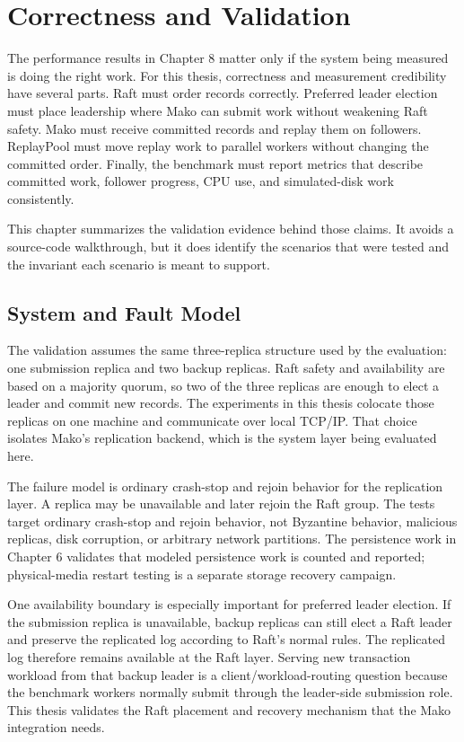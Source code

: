 \chapter{Correctness and Validation}

The performance results in Chapter 8 matter only if the system being measured is
doing the right work. For this thesis, correctness and measurement credibility
have several parts. Raft must order records correctly. Preferred leader election
must place leadership where Mako can submit work without weakening Raft safety.
Mako must receive committed records and replay them on followers. ReplayPool
must move replay work to parallel workers without changing the committed order.
Finally, the benchmark must report metrics that describe committed work,
follower progress, CPU use, and simulated-disk work consistently.

This chapter summarizes the validation evidence behind those claims. It avoids
a source-code walkthrough, but it does identify the scenarios that were tested
and the invariant each scenario is meant to support.

\section{System and Fault Model}

The validation assumes the same three-replica structure used by the evaluation:
one submission replica and two backup replicas. Raft safety and availability
are based on a majority quorum, so two of the three replicas are enough to elect
a leader and commit new records. The experiments in this thesis colocate those
replicas on one machine and communicate over local TCP/IP. That choice isolates
Mako's replication backend, which is the system layer being evaluated here.

The failure model is ordinary crash-stop and rejoin behavior for the
replication layer. A replica may be unavailable and later rejoin the Raft group.
The tests target ordinary crash-stop and rejoin behavior, not Byzantine
behavior, malicious replicas, disk corruption, or arbitrary network partitions.
The persistence work in Chapter 6 validates that modeled persistence work is
counted and reported; physical-media restart testing is a separate storage
recovery campaign.

One availability boundary is especially important for preferred leader
election. If the submission replica is unavailable, backup replicas can still
elect a Raft leader and preserve the replicated log according to Raft's normal
rules. The replicated log therefore remains available at the Raft layer.
Serving new transaction workload from that backup leader is a
client/workload-routing question because the benchmark workers normally submit
through the leader-side submission role. This thesis validates the Raft
placement and recovery mechanism that the Mako integration needs.

